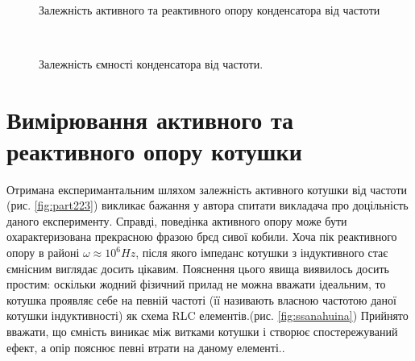 \begin{figure}[h]
\begin{minipage}[h]{0.47\linewidth}
        \\
    \end{minipage}
    \caption{Залежність активного та реактивного опору конденсатора від частоти}
    \label{fig:part222}
\end{figure}

\begin{figure}[h]
     \\
    \caption{Залежність ємності конденсатора від частоти.}
    \label{fig:part2C}
\end{figure}

\section{Вимірювання активного та реактивного опору котушки}

Отримана експеримантальним шляхом залежність активного котушки від частоти (рис. \ref{fig:part223}) викликає бажання у автора спитати викладача про доцільність даного експерименту. Справді, поведінка активного опору може бути охарактеризована прекрасною фразою брєд сивої кобили. Хоча пік реактивного опору в районі $\omega \approx 10^6 Hz$, після якого імпеданс котушки з індуктивного стає ємнісним виглядає досить цікавим. Пояснення цього явища виявилось досить простим: оскільки жодний фізичний прилад не можна вважати ідеальним, то котушка проявляє себе на певній частоті (її називають власною частотою даної котушки індуктивності) як схема RLC елементів.(рис. \ref{fig:ssanahuina}) Прийнято вважати, що ємність виникає між витками котушки і створює спостережуваний ефект, а опір пояснює певні втрати на даному елементі.\cite{huina}.

